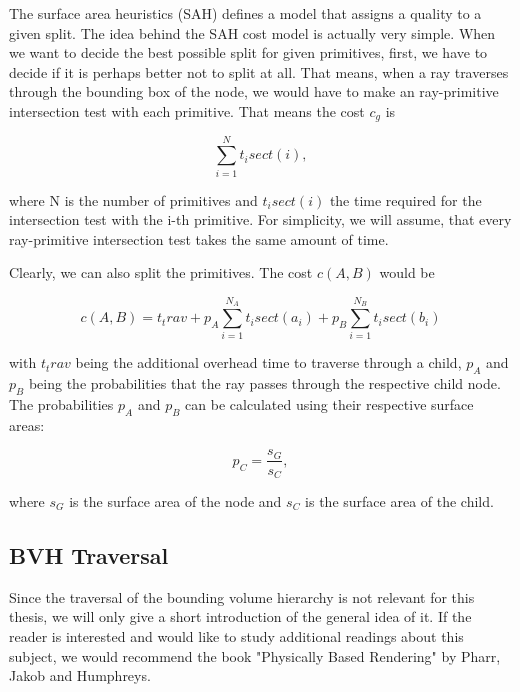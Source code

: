 The surface area heuristics (SAH) defines a model that assigns a quality to a given split. The idea behind the SAH cost model is actually very simple. When we want to decide the best possible split for given primitives, first, we have to decide if it is perhaps better not to split at all. That means, when a ray traverses through the bounding box of the node, we would have to make an ray-primitive intersection test with each primitive. That means the cost $c_g$ is 

\begin{equation}
\sum_{i = 1}^{N}t_isect(i),
\end{equation}

where N is the number of primitives and $t_isect(i)$ the time required for the intersection test with the i-th primitive. For simplicity, we will assume, that every ray-primitive intersection test takes the same amount of time.

Clearly, we can also split the primitives. The cost $c(A,B)$ would be

\begin{equation}
c(A,B) = t_trav + p_A\sum_{i=1}^{N_A}t_isect(a_i) + p_B\sum_{i=1}^{N_B}t_isect(b_i)
\end{equation}

with $t_trav$ being the additional overhead time to traverse through a child, $p_A$ and $p_B$ being the probabilities that the ray passes through the respective child node. The probabilities $p_A$ and $p_B$ can be calculated using their respective surface areas:

\begin{equation}
p_C = \frac{s_G}{s_C},
\end{equation}

where $s_G$ is the surface area of the node and $s_C$ is the surface area of the child.

\subsection{BVH Traversal}

Since the traversal of the bounding volume hierarchy is not relevant for this thesis, we will only give a short introduction of the general idea of it. If the reader is interested and would like to study additional readings about this subject, we would recommend the book "Physically Based Rendering" by Pharr, Jakob and Humphreys. \Cite{PBR}

